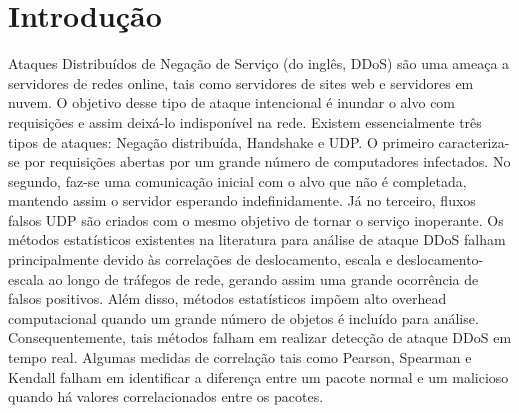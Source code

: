 \chapter[Introdução]{Introdução}
\label{introducao}
Ataques Distribuídos de Negação de Serviço (do inglês, DDoS) são uma ameaça a servidores de redes online, tais como servidores de sites web e servidores em nuvem. O objetivo desse tipo de ataque intencional é inundar o alvo com requisições e assim deixá-lo indisponível na rede. Existem essencialmente três tipos de ataques: Negação distribuída, Handshake e UDP. O primeiro caracteriza-se por requisições abertas por um grande número de computadores infectados. No segundo, faz-se uma comunicação inicial com o alvo que não é completada, mantendo assim o servidor esperando indefinidamente. Já no terceiro, fluxos falsos UDP são criados com o mesmo objetivo de tornar o serviço inoperante. 
Os métodos estatísticos existentes na literatura para análise de ataque DDoS falham principalmente devido às correlações de deslocamento, escala e deslocamento-escala ao longo de tráfegos de rede, gerando assim uma grande ocorrência de falsos positivos. Além disso, métodos estatísticos impõem alto overhead computacional quando um grande número de objetos é incluído para análise. Consequentemente, tais métodos falham em realizar detecção de ataque DDoS em tempo real. Algumas medidas de correlação tais como Pearson, Spearman e Kendall falham em identificar a diferença entre um pacote normal e um malicioso quando há valores correlacionados entre os pacotes.
